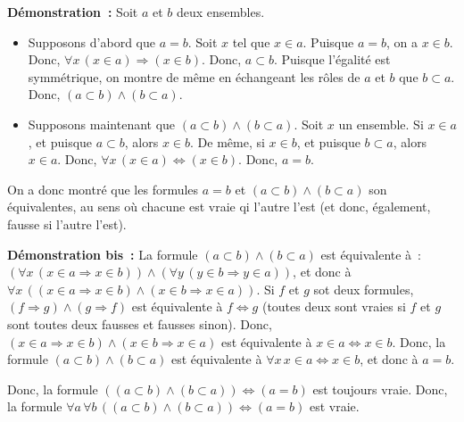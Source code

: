 \medskip

\noindent\textbf{Démonstration :} 
    Soit $a$ et $b$ deux ensembles. 
    \begin{itemize}[nosep]
        \item Supposons d'abord que $a = b$.
            Soit $x$ tel que $x \in a$. 
            Puisque $a = b$, on a $x \in b$. 
            Donc, $\forall x \, (x \in a) \Rightarrow (x \in b)$.
            Donc, $a \subset b$. 
            Puisque l'égalité est symmétrique, on montre de même en échangeant les rôles de $a$ et $b$ que $b \subset a$.
            Donc, $(a \subset b) \wedge (b \subset a)$. 
        \item Supposons maintenant que $(a \subset b) \wedge (b \subset a)$. 
            Soit $x$ un ensemble. 
            Si $x \in a$, et puisque $a \subset b$, alors $x \in b$.
            De même, si $x \in b$, et puisque $b \subset a$, alors $x \in a$.
            Donc, $\forall x \, (x \in a) \Leftrightarrow (x \in b)$. 
            Donc, $a = b$. 
    \end{itemize}
    On a donc montré que les formules $a = b$ et $(a \subset b) \wedge (b \subset a)$ son équivalentes, au sens où chacune est vraie qi l'autre l'est (et donc, également, fausse si l'autre l'est).

   \done 

\medskip

\noindent\textbf{Démonstration bis :} 
    La formule $(a \subset b) \wedge (b \subset a)$ est équivalente à : $(\forall x \, (x \in a \Rightarrow x \in b)) \wedge (\forall y \, (y \in b \Rightarrow y \in a))$, et donc à $\forall x \, ((x \in a \Rightarrow x \in b) \wedge (x \in b \Rightarrow x \in a))$. 
    Si $f$ et $g$ sot deux formules, $(f \Rightarrow g) \wedge (g \Rightarrow f)$ est équivalente à $f \Leftrightarrow g$ (toutes deux sont vraies si $f$ et $g$ sont toutes deux fausses et fausses sinon).
    Donc, $(x \in a \Rightarrow x \in b) \wedge (x \in b \Rightarrow x \in a)$ est équivalente à $x \in a \Leftrightarrow x \in b$.
    Donc, la formule $(a \subset b) \wedge (b \subset a)$ est équivalente à $\forall x \, x \in a \Leftrightarrow x \in b$, et donc à $a = b$.

    Donc, la formule $((a \subset b) \wedge (b \subset a)) \Leftrightarrow (a = b)$ est toujours vraie. 
    Donc, la formule $\forall a \, \forall b \, ((a \subset b) \wedge (b \subset a)) \Leftrightarrow (a = b)$ est vraie. 

    \done

\medskip

